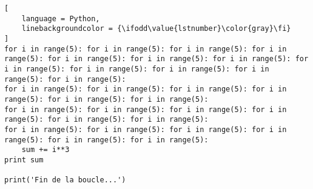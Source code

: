 \documentclass[10pt,a4paper]{article}
\begin{document}
\begin{lstlisting}[
	language = Python,
	linebackgroundcolor = {\ifodd\value{lstnumber}\color{gray}\fi}
]
for i in range(5): for i in range(5): for i in range(5): for i in range(5): for i in range(5): for i in range(5): for i in range(5): for i in range(5): for i in range(5): for i in range(5): for i in range(5): for i in range(5):
for i in range(5): for i in range(5): for i in range(5): for i in range(5): for i in range(5): for i in range(5):
for i in range(5): for i in range(5): for i in range(5): for i in range(5): for i in range(5): for i in range(5):
for i in range(5): for i in range(5): for i in range(5): for i in range(5): for i in range(5): for i in range(5):
    sum += i**3
print sum

print('Fin de la boucle...')
\end{lstlisting}
\end{document}
